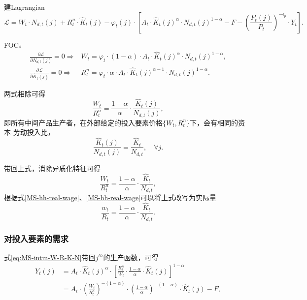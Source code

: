 建Lagrangian
\begin{equation*}
\mathcal{L} = W_t \cdot N_{d,t}(j) + R^n_t \cdot \hat{K}_t(j) - \varphi_t(j) \cdot \left[
A_t \cdot \hat{K}_t(j)^{\alpha} \cdot N_{d,t}(j)^{1-\alpha} - F - \left( \frac{P_{t}(j)}{P_t} \right)^{-\epsilon_p} \cdot Y_t
\right].
\end{equation*}

FOCs
\begin{align*}
\frac{\partial \mathcal{L}}{\partial N_{d,t}(j)} = 0 \Rightarrow & W_t = \varphi_t \cdot (1-\alpha) \cdot A_t \cdot \hat{K}_t(j)^{\alpha} \cdot N_{d,t}(j)^{1-\alpha},  \\
\frac{\partial \mathcal{L}}{\partial \hat{K}_{t}(j)} = 0 \Rightarrow & R^n_t = \varphi_t \cdot \alpha \cdot A_t \cdot \hat{K}_t(j)^{\alpha -1 } \cdot N_{d,t}(j)^{1-\alpha} .
\end{align*}

两式相除可得
\begin{equation*}
\frac{W_t}{R^n_t} = \frac{1-\alpha}{\alpha} \cdot \frac{\hat{K}_t(j)}{N_{d,t}(j)},
\end{equation*}
即所有中间产品生产者，在外部给定的投入要素价格$\{W_t, R^n_t\}$下，会有相同的资本-劳动投入比，
\begin{equation}
\label{eq:MS-K-N-ration-j-ration-equiv}
\frac{\hat{K}_t(j)}{N_{d,t}(j)} = \frac{\hat{K}_t}{N_{d,t}}, \quad \forall j.
\end{equation}

带回上式，消除异质化特征可得
\begin{equation*}
\frac{W_t}{R^n_t} = \frac{1-\alpha}{\alpha} \cdot \frac{\hat{K}_t}{N_{d,t}},
\end{equation*}
根据式\eqref{MS-hh-real-wage}、\eqref{MS-hh-real-wage}可以将上式改写为实际量
\begin{equation}
\label{eq:MS-intm-W-R-K-N}
\frac{w_t}{R_t} = \frac{1-\alpha}{\alpha} \cdot \frac{\hat{K}_t}{N_{d,t}}.
\end{equation}

\subsubsection{对投入要素的需求}
式\eqref{eq:MS-intm-W-R-K-N}带回$j^{th}$的生产函数，可得
\begin{align*}
Y_t(j) &= A_t \cdot \hat{K}_{t}(j)^{\alpha} \cdot \left[\frac{R^n_t}{W_t} \cdot \frac{1-\alpha}{\alpha} \cdot \hat{K}_{t}(j)\right]^{1-\alpha} \\
&= A_t \cdot \left( \frac{W_t}{R^n_t} \right)^{- \left( 1 - \alpha \right) } \cdot \left(\frac{1-\alpha}{\alpha}\right)^{-\left( 1 - \alpha \right)} \cdot \hat{K}_{t}(j)- F,
\end{align*}

